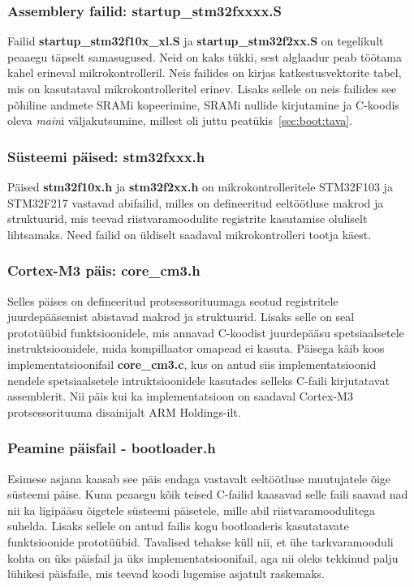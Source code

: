 \documentclass[12pt,a4paper]{article}
\begin{document}
\subsubsection{Assemblery failid: \textbf{startup\_stm32fxxxx.S}}
Failid \textbf{startup\_stm32f10x\_xl.S} ja \textbf{startup\_stm32f2xx.S} on
tegelikult peaaegu täpselt samasugused. Neid on kaks tükki, sest alglaadur peab
töötama kahel erineval mikrokontrolleril. Neis failides on kirjas
katkestusvektorite tabel, mis on kasutataval mikrokontrolleritel erinev. Lisaks
sellele on neis failides see põhiline andmete SRAMi kopeerimine, SRAMi nullide
kirjutamine ja C-koodis oleva \textit{main}i väljakutsumine, millest oli juttu
peatükis~\ref{sec:boot:tava}.

\subsubsection{Süsteemi päised: \textbf{stm32fxxx.h}}
Päised \textbf{stm32f10x.h} ja \textbf{stm32f2xx.h} on mikrokontrolleritele
STM32F103 ja STM32F217 vastavad abifailid, milles on defineeritud eeltöötluse
makrod ja struktuurid, mis teevad riistvaramoodulite registrite kasutamise
oluliselt lihtsamaks. Need failid on üldiselt saadaval mikrokontrolleri tootja
käest.

\subsubsection{Cortex-M3 päis: \textbf{core\_cm3.h}}
Selles päises on defineeritud protsessorituumaga seotud registritele
juurdepääsemist abistavad makrod ja struktuurid. Lisaks selle on seal
prototüübid funktsioonidele, mis annavad C-koodist juurdepääsu spetsiaalsetele
instruktsioonidele, mida kompillaator omapead ei kasuta. Päisega käib koos
implementatsioonifail \textbf{core\_cm3.c}, kus on antud siis implementatsioonid
nendele spetsiaalsetele intruktsioonidele kasutades selleks C-faili kirjutatavat
assemblerit. Nii päis kui ka implementatsioon on saadaval Cortex-M3
protsessorituuma disainijalt ARM Holdings-ilt.

\subsubsection{Peamine päisfail - \textbf{bootloader.h}}
Esimese asjana kaasab see päis endaga vastavalt eeltöötluse muutujatele õige
süsteemi päise. Kuna peaaegu kõik teised C-failid kaasavad selle faili saavad
nad nii ka ligipääsu õigetele süsteemi päisetele, mille abil
riistvaramoodulitega suhelda. Lisaks sellele on antud failis kogu bootloaderis
kasutatavate funktsioonide prototüübid. Tavalised tehakse küll nii, et ühe
tarkvaramooduli kohta on üks päisfail ja üks implementatsioonifail, aga nii
oleks tekkinud palju lühikesi päisfaile, mis teevad koodi lugemise asjatult
raskemaks.
\end{document}
